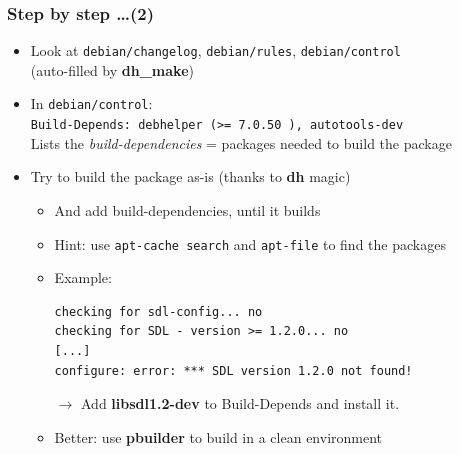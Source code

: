 \documentclass[10pt,final]{beamer}
\begin{document}
\begin{frame}[fragile]
\frametitle{Step by step \ldots (2)}
\begin{itemize}
	\item Look at \texttt{debian/changelog}, \texttt{debian/rules}, \texttt{debian/control}\\
		(auto-filled by \textbf{dh\_make})
		\hbr
	\item In \texttt{debian/control}:\\
		\texttt{Build-Depends: debhelper (>= 7.0.50~), autotools-dev}\\
		Lists the \textsl{build-dependencies} = packages needed to build the package
		\hbr
	\item Try to build the package as-is (thanks to \textbf{dh} magic)
		\begin{itemize}
			\item And add build-dependencies, until it builds
			\item Hint: use \texttt{apt-cache search} and \texttt{apt-file} to find the packages
			\item Example:
\begin{lstlisting}[basicstyle=\ttfamily\footnotesize]
checking for sdl-config... no
checking for SDL - version >= 1.2.0... no
[...]
configure: error: *** SDL version 1.2.0 not found!
\end{lstlisting}
$\rightarrow$ Add \textbf{libsdl1.2-dev} to Build-Depends and install it.
		\hbr
	\item Better: use \textbf{pbuilder} to build in a clean environment
		\end{itemize}
\end{itemize}
\end{frame}
\end{document}
